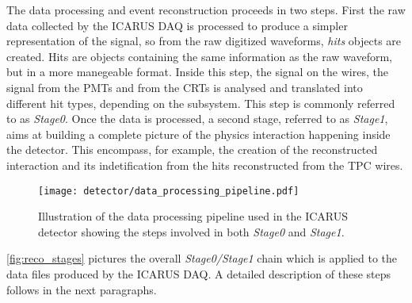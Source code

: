 The data processing and event reconstruction proceeds in two steps. First the raw data collected by the ICARUS DAQ is processed to produce a simpler representation of the signal, so from the raw digitized waveforms, \emph{hits} objects are created. Hits are objects containing the same information as the raw waveform, but in a more manegeable format. Inside this step, the signal on the wires, the signal from the PMTs and from the CRTs is analysed and translated into different hit types, depending on the subsystem. This step is commonly referred to as \emph{Stage0}. Once the data is processed, a second stage, referred to as \emph{Stage1}, aims at building a complete picture of the physics interaction happening inside the detector. This encompass, for example, the creation of the reconstructed interaction and its indetification from the hits reconstructed from the TPC wires. 



\begin{figure}
    \centering
    \texttt{[image: detector/data\_processing\_pipeline.pdf]}
    \caption[\emph{Stage0} and \emph{Stage1} data processing pipeline]{Illustration of the data processing pipeline used in the ICARUS detector showing the steps involved in both \emph{Stage0} and \emph{Stage1}. }
    \label{fig:reco_stages}
\end{figure}

\autoref{fig:reco_stages} pictures the overall \emph{Stage0/Stage1} chain which is applied to the data files produced by the ICARUS DAQ. A detailed description of these steps follows in the next paragraphs. 

